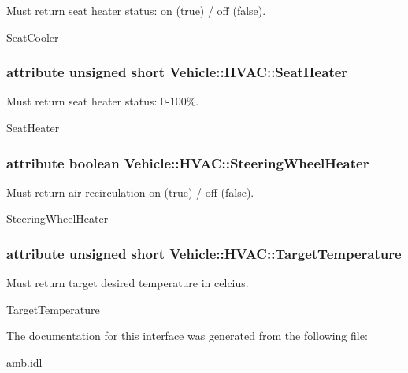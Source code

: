 Must return seat heater status\-: on (true) / off (false). 

Seat\-Cooler \hypertarget{interfaceVehicle_1_1HVAC_ad8fa919cd65bcb69651ee4853f1f0a1f}{
\subsubsection[{Seat\-Heater}]{\setlength{\rightskip}{0pt plus 5cm}attribute unsigned short Vehicle\-::\-H\-V\-A\-C\-::\-Seat\-Heater}}\label{interfaceVehicle_1_1HVAC_ad8fa919cd65bcb69651ee4853f1f0a1f}


Must return seat heater status\-: 0-\/100\%. 

Seat\-Heater \hypertarget{interfaceVehicle_1_1HVAC_a8142d0336d5e8e6366683514d72a30b6}{
\subsubsection[{Steering\-Wheel\-Heater}]{\setlength{\rightskip}{0pt plus 5cm}attribute boolean Vehicle\-::\-H\-V\-A\-C\-::\-Steering\-Wheel\-Heater}}\label{interfaceVehicle_1_1HVAC_a8142d0336d5e8e6366683514d72a30b6}


Must return air recirculation on (true) / off (false). 

Steering\-Wheel\-Heater \hypertarget{interfaceVehicle_1_1HVAC_a8bf4808d406dc7470fc7eb1828595083}{
\subsubsection[{Target\-Temperature}]{\setlength{\rightskip}{0pt plus 5cm}attribute unsigned short Vehicle\-::\-H\-V\-A\-C\-::\-Target\-Temperature}}\label{interfaceVehicle_1_1HVAC_a8bf4808d406dc7470fc7eb1828595083}


Must return target desired temperature in celcius. 

Target\-Temperature 

The documentation for this interface was generated from the following file\-:\begin{DoxyCompactItemize}
\item 
amb.\-idl\end{DoxyCompactItemize}

